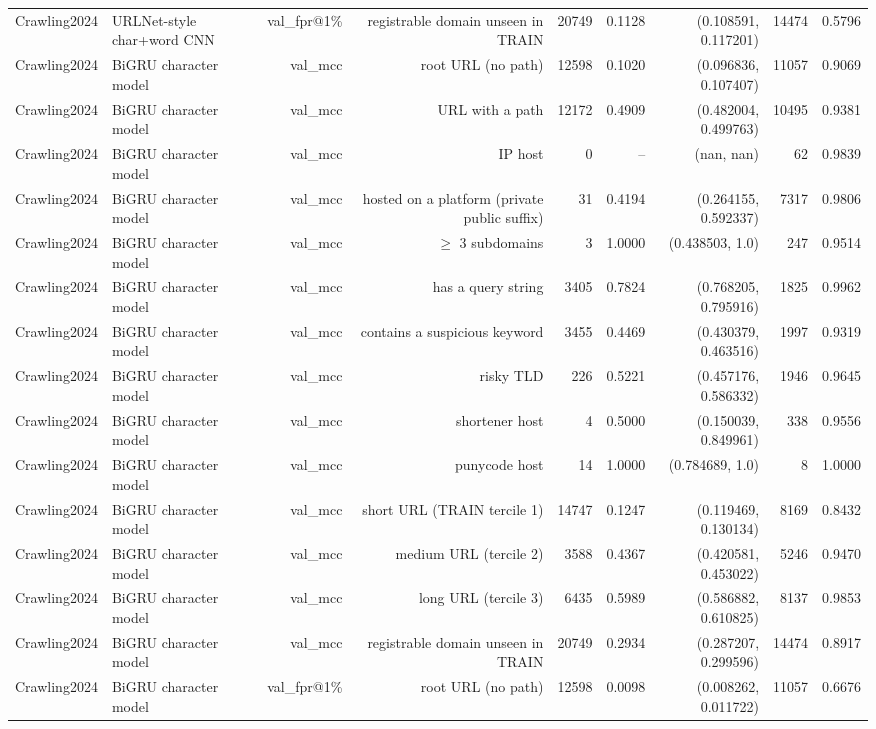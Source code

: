 \begin{table}[t]
\begin{tabular}{llrrrrrrr}
Crawling2024 & URLNet-style char+word CNN & val\_fpr@1\% & registrable domain unseen in TRAIN & 20749 & 0.1128 & (0.108591, 0.117201) & 14474 & 0.5796 \\
Crawling2024 & BiGRU character model & val\_mcc & root URL (no path) & 12598 & 0.1020 & (0.096836, 0.107407) & 11057 & 0.9069 \\
Crawling2024 & BiGRU character model & val\_mcc & URL with a path & 12172 & 0.4909 & (0.482004, 0.499763) & 10495 & 0.9381 \\
Crawling2024 & BiGRU character model & val\_mcc & IP host & 0 & -- & (nan, nan) & 62 & 0.9839 \\
Crawling2024 & BiGRU character model & val\_mcc & hosted on a platform (private public suffix) & 31 & 0.4194 & (0.264155, 0.592337) & 7317 & 0.9806 \\
Crawling2024 & BiGRU character model & val\_mcc & $\geq$ 3 subdomains & 3 & 1.0000 & (0.438503, 1.0) & 247 & 0.9514 \\
Crawling2024 & BiGRU character model & val\_mcc & has a query string & 3405 & 0.7824 & (0.768205, 0.795916) & 1825 & 0.9962 \\
Crawling2024 & BiGRU character model & val\_mcc & contains a suspicious keyword & 3455 & 0.4469 & (0.430379, 0.463516) & 1997 & 0.9319 \\
Crawling2024 & BiGRU character model & val\_mcc & risky TLD & 226 & 0.5221 & (0.457176, 0.586332) & 1946 & 0.9645 \\
Crawling2024 & BiGRU character model & val\_mcc & shortener host & 4 & 0.5000 & (0.150039, 0.849961) & 338 & 0.9556 \\
Crawling2024 & BiGRU character model & val\_mcc & punycode host & 14 & 1.0000 & (0.784689, 1.0) & 8 & 1.0000 \\
Crawling2024 & BiGRU character model & val\_mcc & short URL (TRAIN tercile 1) & 14747 & 0.1247 & (0.119469, 0.130134) & 8169 & 0.8432 \\
Crawling2024 & BiGRU character model & val\_mcc & medium URL (tercile 2) & 3588 & 0.4367 & (0.420581, 0.453022) & 5246 & 0.9470 \\
Crawling2024 & BiGRU character model & val\_mcc & long URL (tercile 3) & 6435 & 0.5989 & (0.586882, 0.610825) & 8137 & 0.9853 \\
Crawling2024 & BiGRU character model & val\_mcc & registrable domain unseen in TRAIN & 20749 & 0.2934 & (0.287207, 0.299596) & 14474 & 0.8917 \\
Crawling2024 & BiGRU character model & val\_fpr@1\% & root URL (no path) & 12598 & 0.0098 & (0.008262, 0.011722) & 11057 & 0.6676 \\

\end{tabular}
\end{table}
